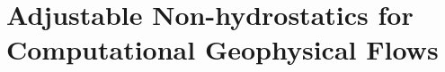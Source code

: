 \chapter{Adjustable Non-hydrostatics for Computational Geophysical Flows}
\label{chapter:ANH}







